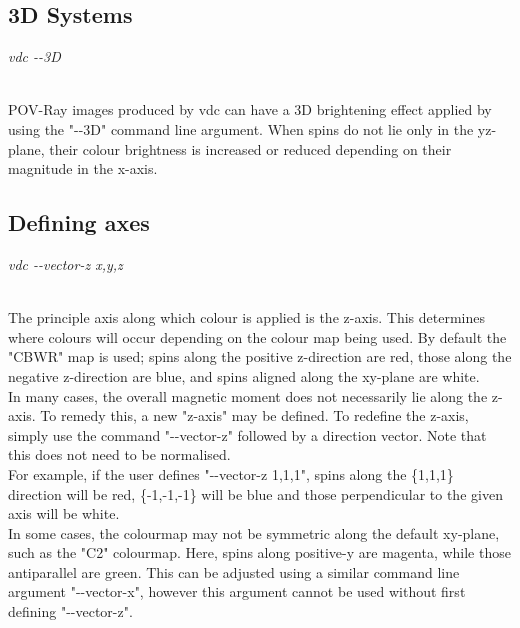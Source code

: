\subsection*{3D Systems}

\begin{minipage}[c]{\textwidth}
\centering
\textit{vdc -{}-3D}
\end{minipage}\\

POV-Ray images produced by vdc can have a 3D brightening effect applied by using the "-{}-3D" command line argument. When spins do not lie only in the yz-plane, their colour brightness is increased or reduced depending on their magnitude in the x-axis. \\

\subsection*{Defining axes}

\begin{minipage}[c]{\textwidth}
\centering
\textit{vdc -{}-vector-z x,y,z}
\end{minipage}\\

The principle axis along which colour is applied is the z-axis. This determines where colours will occur depending on the colour map being used. By default the "CBWR" map is used; spins along the positive z-direction are red, those along the negative z-direction are blue, and spins aligned along the xy-plane are white.\\

In many cases, the overall magnetic moment does not necessarily lie along the z-axis. To remedy this, a new "z-axis" may be defined. To redefine the z-axis, simply use the command "-{}-vector-z" followed by a direction vector. Note that this does not need to be normalised.\\

For example, if the user defines "-{}-vector-z 1,1,1", spins along the \{1,1,1\} direction will be red, \{-1,-1,-1\} will be blue and those perpendicular to the given axis will be white.\\

In some cases, the colourmap may not be symmetric along the default xy-plane, such as the "C2" colourmap. Here, spins along positive-y are magenta, while those antiparallel are green. This can be adjusted using a similar command line argument "-{}-vector-x", however this argument cannot be used without first defining "-{}-vector-z". \\

